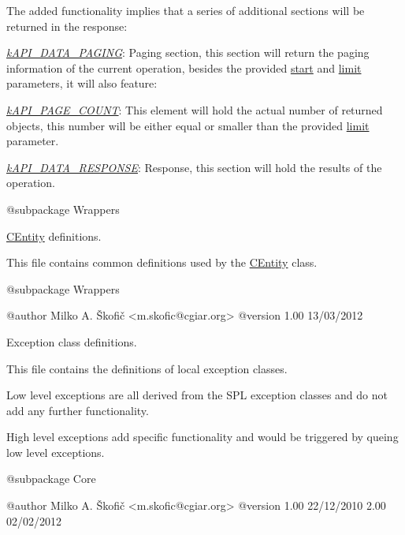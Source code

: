 The added functionality implies that a series of additional sections will be returned in the response\-:


\begin{DoxyItemize}
\item {\itshape \hyperlink{}{k\-A\-P\-I\-\_\-\-D\-A\-T\-A\-\_\-\-P\-A\-G\-I\-N\-G}\/}\-: Paging section, this section will return the paging information of the current operation, besides the provided \hyperlink{}{start} and \hyperlink{}{limit} parameters, it will also feature\-: 
\begin{DoxyItemize}
\item {\itshape \hyperlink{}{k\-A\-P\-I\-\_\-\-P\-A\-G\-E\-\_\-\-C\-O\-U\-N\-T}\/}\-: This element will hold the actual number of returned objects, this number will be either equal or smaller than the provided \hyperlink{}{limit} parameter. 
\end{DoxyItemize}
\item {\itshape \hyperlink{}{k\-A\-P\-I\-\_\-\-D\-A\-T\-A\-\_\-\-R\-E\-S\-P\-O\-N\-S\-E}\/}\-: Response, this section will hold the results of the operation. 
\end{DoxyItemize}

\begin{DoxyVerb}    @subpackage     Wrappers\end{DoxyVerb}


\hyperlink{class_c_entity}{C\-Entity} definitions.

This file contains common definitions used by the \hyperlink{class_c_entity}{C\-Entity} class.

\begin{DoxyVerb}    @subpackage     Wrappers

    @author         Milko A. Škofič <m.skofic@cgiar.org>
    @version        1.00 13/03/2012\end{DoxyVerb}


Exception class definitions.

This file contains the definitions of local exception classes.

Low level exceptions are all derived from the S\-P\-L exception classes and do not add any further functionality.

High level exceptions add specific functionality and would be triggered by queing low level exceptions.

\begin{DoxyVerb}    @subpackage     Core

    @author         Milko A. Škofič <m.skofic@cgiar.org>
    @version        1.00 22/12/2010
                            2.00 02/02/2012\end{DoxyVerb}



